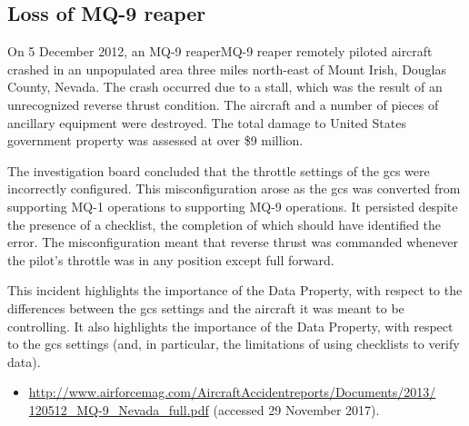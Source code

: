 \subsection{Loss of MQ-9 reaper} \label{bkm:incacc:mq9reaper}
On 5 December 2012, an MQ-9 reaperMQ-9 reaper remotely piloted aircraft crashed in an unpopulated area three miles north-east of Mount Irish, Douglas County, Nevada. The crash occurred due to a stall, which was the result of an unrecognized reverse thrust condition. The aircraft and a number of pieces of ancillary equipment were destroyed. The total damage to United States government property was assessed at over \$9 million.

The investigation board concluded that the throttle settings of the \gls{gcs} were incorrectly configured. This misconfiguration arose as the \gls{gcs} was converted from supporting MQ-1 operations to supporting MQ-9 operations. It persisted despite the presence of a checklist, the completion of which should have identified the error. The misconfiguration meant that reverse thrust was commanded whenever the pilot's throttle was in any position except full forward.

This incident highlights the importance of the  Data Property, with respect to the differences between the \gls{gcs} settings and the aircraft it was meant to be controlling. It also highlights the importance of the  Data Property, with respect to the \gls{gcs} settings (and, in particular, the limitations of using checklists to verify data).

\begin{samepage}
\begin{itemize}
	\item \raggedright{\href{http://www.airforcemag.com/AircraftAccidentreports/Documents/2013/120512_MQ-9_Nevada_full.pdf}{http://www.airforcemag.com/AircraftAccidentreports/Documents/2013/ 120512\_MQ-9\_Nevada\_full.pdf} (accessed 29 November 2017).}
\end{itemize}
\end{samepage}


